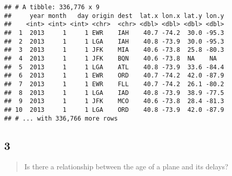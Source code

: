 \documentclass[]{ltjsarticle}
\newenvironment{Shaded}{\begin{snugshade}}{\end{snugshade}}
\newcommand{\DataTypeTok}[1]{\textcolor[rgb]{0.13,0.29,0.53}{#1}}
\newcommand{\KeywordTok}[1]{\textcolor[rgb]{0.13,0.29,0.53}{\textbf{#1}}}
\newcommand{\NormalTok}[1]{#1}
\newcommand{\OperatorTok}[1]{\textcolor[rgb]{0.81,0.36,0.00}{\textbf{#1}}}
\newcommand{\OtherTok}[1]{\textcolor[rgb]{0.56,0.35,0.01}{#1}}
\newcommand{\StringTok}[1]{\textcolor[rgb]{0.31,0.60,0.02}{#1}}
\begin{document}
\begin{verbatim}
## # A tibble: 336,776 x 9
##     year month   day origin dest  lat.x lon.x lat.y lon.y
##    <int> <int> <int> <chr>  <chr> <dbl> <dbl> <dbl> <dbl>
##  1  2013     1     1 EWR    IAH    40.7 -74.2  30.0 -95.3
##  2  2013     1     1 LGA    IAH    40.8 -73.9  30.0 -95.3
##  3  2013     1     1 JFK    MIA    40.6 -73.8  25.8 -80.3
##  4  2013     1     1 JFK    BQN    40.6 -73.8  NA    NA  
##  5  2013     1     1 LGA    ATL    40.8 -73.9  33.6 -84.4
##  6  2013     1     1 EWR    ORD    40.7 -74.2  42.0 -87.9
##  7  2013     1     1 EWR    FLL    40.7 -74.2  26.1 -80.2
##  8  2013     1     1 LGA    IAD    40.8 -73.9  38.9 -77.5
##  9  2013     1     1 JFK    MCO    40.6 -73.8  28.4 -81.3
## 10  2013     1     1 LGA    ORD    40.8 -73.9  42.0 -87.9
## # ... with 336,766 more rows
\end{verbatim}

\hypertarget{section-14}{%
\subsection{3}\label{section-14}}

\begin{quote}
Is there a relationship between the age of a plane and its delays?
\end{quote}

\begin{Shaded}
\end{Shaded}
\end{document}
